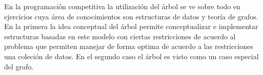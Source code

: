 En la programación competitiva la utilización del árbol se ve sobre todo en ejercicios cuya área de conocimientos son estructuras de datos y teoría de grafos. En la primera la idea conceptual del árbol permite conceptualizar e implementar estructuras basadas en este modelo con ciertas restricciones de acuerdo al problema que permiten manejar de forma optima de acuerdo a las restricciones una coleción de datos. En el segundo caso el árbol es visto como un caso especial del grafo.